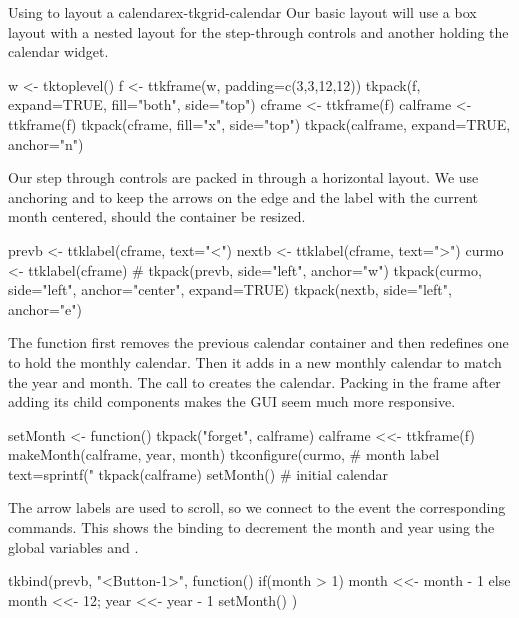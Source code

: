 \begin{example}{Using  to layout a calendar}{ex-tkgrid-calendar}
Our basic layout will use a box layout with a nested layout
for the step-through controls and another holding the calendar widget.
\begin{Schunk}
\begin{Sinput}
 w <- tktoplevel()
 f <- ttkframe(w, padding=c(3,3,12,12))
 tkpack(f, expand=TRUE, fill="both", side="top")
 cframe <- ttkframe(f)
 calframe <- ttkframe(f)
 tkpack(cframe, fill="x", side="top")
 tkpack(calframe, expand=TRUE, anchor="n")
\end{Sinput}
\end{Schunk}

Our step through controls are packed in through a horizontal
layout. We use anchoring and  to keep the arrows on the edge and the
label with the current month centered, should the container be resized.
\begin{Schunk}
\begin{Sinput}
 prevb <- ttklabel(cframe, text="<")
 nextb <- ttklabel(cframe, text=">")
 curmo <- ttklabel(cframe)
 #
 tkpack(prevb, side="left", anchor="w")
 tkpack(curmo, side="left", anchor="center", expand=TRUE)
 tkpack(nextb, side="left", anchor="e")
\end{Sinput}
\end{Schunk}

The  function first removes the previous calendar
container and then
redefines one to hold the monthly calendar. Then it adds in a new
monthly calendar to match the year and month. The call to
 creates the calendar. Packing in the frame after
adding its child components makes the GUI seem much more responsive.
\begin{Schunk}
\begin{Sinput}
 setMonth <- function() {
   tkpack("forget", calframe)
   calframe <<- ttkframe(f)
   makeMonth(calframe, year, month)
   tkconfigure(curmo,                    # month label
               text=sprintf("%
   tkpack(calframe)
 }
 setMonth()                              # initial calendar
\end{Sinput}
\end{Schunk}

The arrow labels are used to scroll, so we connect to the
 event the corresponding commands. This shows the
binding to decrement the month and year using the global variables
 and .
\begin{Schunk}
\begin{Sinput}
 tkbind(prevb, "<Button-1>", function() {
   if(month > 1) {
     month <<- month - 1
   } else {
     month <<- 12; year <<- year - 1
   }
   setMonth()
 })
\end{Sinput}
\end{Schunk}



\end{example}
